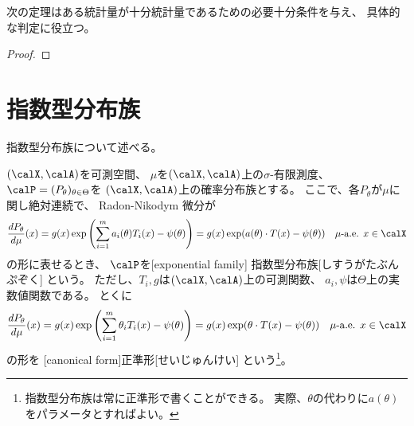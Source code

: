 \documentclass[report]{jlreq}
\begin{document}
\begin{example}
    \TODO{}
\end{example}

次の定理はある統計量が十分統計量であるための必要十分条件を与え、
具体的な判定に役立つ。

\begin{theorem}
    \TODO{}
\end{theorem}

\begin{proof}
    \TODO{}
\end{proof}

\begin{example}[正規分布の例]
    \TODO{}
\end{example}

%
\section{指数型分布族}

指数型分布族について述べる。

\begin{definition}[指数型分布族]
    $(\calX, \calA)$を可測空間、
    $\mu$を$(\calX, \calA)$上の$\sigma$-有限測度、
    $\calP = (P_\theta)_{\theta \in \Theta}$を
    $(\calX, \calA)$上の確率分布族とする。
    ここで、各$P_\theta$が$\mu$に関し絶対連続で、
    Radon-Nikodym 微分が
    \begin{equation}
        \frac{dP_\theta}{d\mu}(x)
            = g(x) \exp\myparen{
                \sum_{i = 1}^m a_i(\theta) T_i(x)
                - \psi(\theta)
            }
            = g(x) \exp(a(\theta) \cdot T(x) - \psi(\theta))
            \quad
            \text{$\mu$-a.e. $x \in \calX$}
    \end{equation}
    の形に表せるとき、
    $\calP$を[exponential family]
        {指数型分布族}[しすうがたぶんぷぞく]
    という。
    ただし、$T_i, g$は$(\calX, \calA)$上の可測関数、
    $a_i, \psi$は$\Theta$上の実数値関数である。
    とくに
    \begin{equation}
        \frac{dP_\theta}{d\mu}(x)
            = g(x) \exp\myparen{
                \sum_{i = 1}^m \theta_i T_i(x)
                - \psi(\theta)
            }
            = g(x) \exp(\theta \cdot T(x) - \psi(\theta))
            \quad
            \text{$\mu$-a.e. $x \in \calX$}
    \end{equation}
    の形を
    [canonical form]{正準形}[せいじゅんけい]
    という\footnote{
        指数型分布族は常に正準形で書くことができる。
        実際、$\theta$の代わりに$a(\theta)$をパラメータとすればよい。
    }。
\end{definition}
\end{document}

